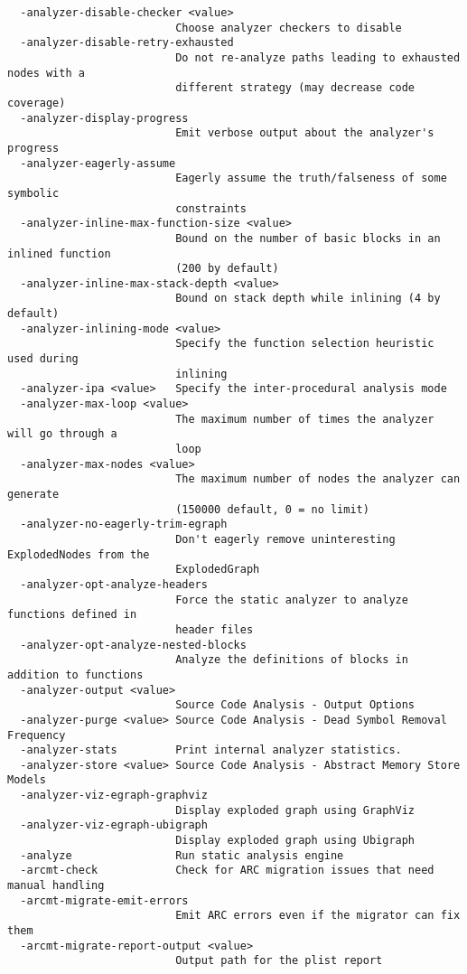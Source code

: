 \begin{verbatim}
  -analyzer-disable-checker <value>
                          Choose analyzer checkers to disable
  -analyzer-disable-retry-exhausted
                          Do not re-analyze paths leading to exhausted nodes with a 
                          different strategy (may decrease code coverage)
  -analyzer-display-progress
                          Emit verbose output about the analyzer's progress
  -analyzer-eagerly-assume
                          Eagerly assume the truth/falseness of some symbolic 
                          constraints
  -analyzer-inline-max-function-size <value>
                          Bound on the number of basic blocks in an inlined function 
                          (200 by default)
  -analyzer-inline-max-stack-depth <value>
                          Bound on stack depth while inlining (4 by default)
  -analyzer-inlining-mode <value>
                          Specify the function selection heuristic used during 
                          inlining
  -analyzer-ipa <value>   Specify the inter-procedural analysis mode
  -analyzer-max-loop <value>
                          The maximum number of times the analyzer will go through a 
                          loop
  -analyzer-max-nodes <value>
                          The maximum number of nodes the analyzer can generate 
                          (150000 default, 0 = no limit)
  -analyzer-no-eagerly-trim-egraph
                          Don't eagerly remove uninteresting ExplodedNodes from the 
                          ExplodedGraph
  -analyzer-opt-analyze-headers
                          Force the static analyzer to analyze functions defined in 
                          header files
  -analyzer-opt-analyze-nested-blocks
                          Analyze the definitions of blocks in addition to functions
  -analyzer-output <value>
                          Source Code Analysis - Output Options
  -analyzer-purge <value> Source Code Analysis - Dead Symbol Removal Frequency
  -analyzer-stats         Print internal analyzer statistics.
  -analyzer-store <value> Source Code Analysis - Abstract Memory Store Models
  -analyzer-viz-egraph-graphviz
                          Display exploded graph using GraphViz
  -analyzer-viz-egraph-ubigraph
                          Display exploded graph using Ubigraph
  -analyze                Run static analysis engine
  -arcmt-check            Check for ARC migration issues that need manual handling
  -arcmt-migrate-emit-errors
                          Emit ARC errors even if the migrator can fix them
  -arcmt-migrate-report-output <value>
                          Output path for the plist report

\end{verbatim}
